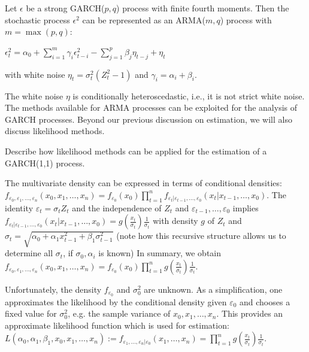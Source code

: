 Let \(\epsilon\) be a strong GARCH(\(p, q\)) process with finite fourth moments. 
Then the stochastic process \(\epsilon^2\) can be represented as an ARMA(\(m, q\)) process with \(m = \max(p, q)\):

\(\epsilon_t^2 = \alpha_0 + \sum_{i = 1}^m \gamma_i \epsilon_{t - i}^2 - \sum_{j = 1}^p \beta_j \eta_{t - j} + \eta_t\)

with white noise \(\eta_t = \sigma_t^2 (Z_t^2 - 1)\) and \(\gamma_i = \alpha_i + \beta_i\).

The white noise \(\eta\) is conditionally heteroscedastic, i.e., it is not strict white noise.
The methods available for ARMA processes can be exploited for the analysis of GARCH processes.
Beyond our previous discussion on estimation, we will also discuss likelihood methods.


Describe how likelihood methods can be applied for the estimation of a GARCH(1,1) process.


The multivariate density can be expressed in terms of conditional densities:
\(
f_{\varepsilon_0, \varepsilon_1, \dots, \varepsilon_n}(x_0, x_1, \dots, x_n) = 
f_{\varepsilon_0}(x_0) \prod_{t=1}^{n} f_{\varepsilon_t | \varepsilon_{t-1}, \dots, \varepsilon_0} (x_t | x_{t-1}, \dots, x_0).
\)
The identity \( \varepsilon_t = \sigma_t Z_t \) and the independence of \( Z_t \) and \( \varepsilon_{t-1}, \dots, \varepsilon_0 \) implies
\(
f_{\varepsilon_t | \varepsilon_{t-1}, \dots, \varepsilon_0} (x_t | x_{t-1}, \dots, x_0) = g\left( \frac{x_t}{\sigma_t} \right) \frac{1}{\sigma_t}
\)
with density \( g \) of \( Z_t \) and \( \sigma_t = \sqrt{\alpha_0 + \alpha_1 x_{t-1}^2 + \beta_1 \sigma_{t-1}^2} \) 
(note how this recursive structure allows us to determine all \( \sigma_t \), if \( \sigma_0, \alpha_i \) is known)
In summary, we obtain
\(
f_{\varepsilon_0, \varepsilon_1, \dots, \varepsilon_n}(x_0, x_1, \dots, x_n) = f_{\varepsilon_0}(x_0) \prod_{t=1}^{n} g\left( \frac{x_t}{\sigma_t} \right) \frac{1}{\sigma_t}.
\)

Unfortunately, the density \( f_{\varepsilon_0} \) and \( \sigma_0^2 \) are unknown. As a simplification, 
one approximates the likelihood by the conditional density given \( \varepsilon_0 \) and chooses a fixed value for \( \sigma_0^2 \), 
e.g. the sample variance of \( x_0, x_1, \dots, x_n \). 
This provides an approximate likelihood function which is used for estimation:
\(
L(\alpha_0, \alpha_1, \beta_1, x_0, x_1, \dots, x_n) := f_{\varepsilon_1, \dots, \varepsilon_n | \varepsilon_0} (x_1, \dots, x_n) = \prod_{t=1}^{n} g\left( \frac{x_t}{\sigma_t} \right) \frac{1}{\sigma_t}.
\)

